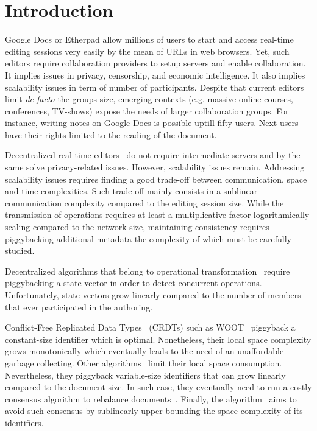 
\section{Introduction}

Google Docs or Etherpad allow millions of users to start and access real-time
editing sessions very easily by the mean of URLs in web browsers. Yet, such
editors require collaboration providers to setup servers and enable
collaboration. It implies issues in privacy, censorship, and economic
intelligence. It also implies scalability issues in term of number of
participants. Despite that current editors limit \emph{de facto} the groups
size, emerging contexts (e.g. massive online courses, conferences, TV-shows)
expose the needs of larger collaboration groups.  For instance, writing notes on
Google Docs is possible uptill fifty users. Next users have their rights limited
to the reading of the document.

Decentralized real-time editors~\cite{oster2006data, sun1998operational,
  sun2009contextbased} do not require intermediate servers and by the same solve
privacy-related issues. However, scalability issues remain.  Addressing
scalability issues requires finding a good trade-off between communication,
space and time complexities. Such trade-off mainly consists in a sublinear
communication complexity compared to the editing session size. While the
transmission of operations requires at least a multiplicative factor
logarithmically scaling compared to the network size, maintaining consistency
requires piggybacking additional metadata the complexity of which must be
carefully studied.

Decentralized algorithms that belong to operational
transformation~\cite{sun2009contextbased} require piggybacking a state vector in
order to detect concurrent operations. Unfortunately, state vectors grow
linearly compared to the number of members that ever participated in the
authoring.

Conflict-Free Replicated Data Types~\cite{shapiro2011comprehensive} (CRDTs) such
as WOOT~\cite{oster2006data} piggyback a constant-size identifier which is
optimal. Nonetheless, their local space complexity grows monotonically which
eventually leads to the need of an unaffordable garbage collecting. Other
algorithms~\cite{weiss2010logootundo, preguica2009commutative} limit their local
space consumption. Nevertheless, they piggyback variable-size identifiers that
can grow linearly compared to the document size. In such case, they eventually
need to run a costly consensus algorithm to rebalance
documents~\cite{zawirski2011asynchronous}. Finally, the \LSEQ
algorithm~\cite{nedelec2013concurrency} aims to avoid such consensus by
sublinearly upper-bounding the space complexity of its identifiers. 

